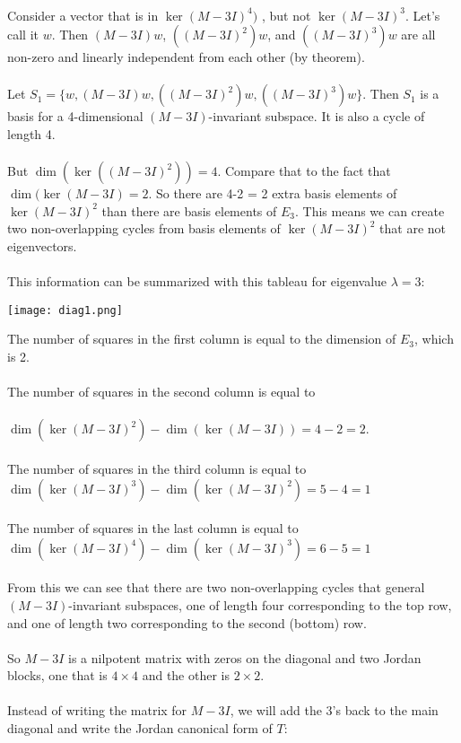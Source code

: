 \documentclass[fontsize=12pt]{scrartcl}
\begin{document}
\\
Consider a vector that is in $\ker(M - 3I)^4)$ , but not $\ker(M - 3I)^3$. Let's call it $w$. Then $(M - 3I)w$, $((M-3I)^2) w$, and $((M-3I)^3 )w$ are all non-zero and linearly independent from each other (by theorem).\\
\\
Let $S_1 = \{ w, (M-3I)w, ((M-3I)^2) w, ((M-3I)^3) w\}$. Then $S_1$ is a basis for a 4-dimensional $(M-3I)$-invariant subspace. It is also a cycle of length 4.\\
\\
But $\dim(\ker((M-3I)^2)) = 4$. Compare that to the fact that $\dim(\ker(M-3I) = 2$. So there are 4-2 = 2 extra basis elements of $\ker(M-3I)^2$ than there are basis elements of $E_3$. This means we can create two non-overlapping cycles from basis elements of $\ker(M-3I)^2$ that are not eigenvectors.\\
\\
This information can be summarized with this tableau for eigenvalue $\lambda = 3$:

\texttt{[image: diag1.png]}

\noindent
The number of squares in the first column is equal to the dimension of $E_3$, which is 2.\\
\\
The number of squares in the second column is equal to\\
\\
$\dim(\ker(M - 3I)^2) - \dim(\ker(M-3I)) = 4 - 2 = 2$.\\
\\
The number of squares in the third column is equal to \\
$\dim(\ker(M - 3I)^3) - \dim(\ker(M-3I)^2) = 5-4 = 1$\\
\\
The number of squares in the last column is equal to\\
$\dim(\ker(M - 3I)^4) - \dim(\ker(M-3I)^3) = 6-5 = 1$\\
\\
From this we can see that there are two non-overlapping cycles that general $(M-3I)$-invariant subspaces, one of length four corresponding to the top row, and one of length two corresponding to the second (bottom) row.\\
\\
So $M-3I$ is a nilpotent matrix with zeros on the diagonal and two Jordan blocks, one that is $4\times 4$ and the other is $2\times 2$.\\
\\
Instead of writing the matrix for $M-3I$, we will add the 3's back to the main diagonal and write the Jordan canonical form of $T$:
\end{document}
